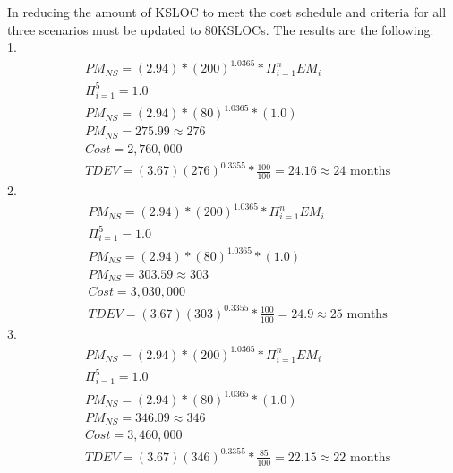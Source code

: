 \documentclass[12pt,letterpaper]{article}
\begin{document}
In reducing the amount of KSLOC to meet the cost schedule and criteria for all three scenarios must be updated to 80KSLOCs. The results are the following:\\
1. \\
    \begin{align*}
        &PM_{NS} = (2.94)*(200)^{1.0365} * \Pi_{i=1}^{n}EM_i\\
        &\Pi_{i=1}^{5} = 1.0\\
        &PM_{NS} = (2.94)*(80)^{1.0365} * (1.0) \\
        &PM_{NS} = 275.99 \approx 276  \\
        &Cost = 2,760,000\\
        &TDEV = (3.67)(276)^{0.3355}* \frac{100}{100} =  24.16 \approx 24 \text{ months}
    \end{align*}
2.\\
    \begin{align*}
        &PM_{NS} = (2.94)*(200)^{1.0365} * \Pi_{i=1}^{n}EM_i\\
        &\Pi_{i=1}^{5} = 1.0\\
        &PM_{NS} = (2.94)*(80)^{1.0365} * (1.0) \\
        &PM_{NS} = 303.59 \approx 303 \\
        &Cost = 3,030,000\\
        &TDEV = (3.67)(303)^{0.3355}* \frac{100}{100} =  24.9 \approx 25 \text{ months}
    \end{align*} 
3.\\
    \begin{align*}
        &PM_{NS} = (2.94)*(200)^{1.0365} * \Pi_{i=1}^{n}EM_i\\
        &\Pi_{i=1}^{5} = 1.0\\
        &PM_{NS} = (2.94)*(80)^{1.0365} * (1.0) \\
        &PM_{NS} = 346.09 \approx 346 \\
        &Cost = 3,460,000\\
        &TDEV = (3.67)(346)^{0.3355}* \frac{85}{100} =  22.15 \approx 22 \text{ months}
    \end{align*} 
\end{document}
